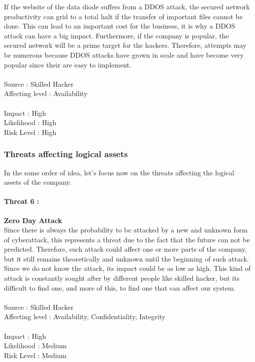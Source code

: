 \documentclass[a4paper,10pt]{article}
\begin{document}
If the website of the data diode suffers from a DDOS attack, the secured network productivity can grid to a total halt if the transfer of important files cannot be done. This can lead to an important cost for the business, it is why a DDOS attack can have a big impact. Furthermore, if the company is popular, the secured network will be a prime target for the hackers. Therefore, attempts may be numerous because DDOS attacks have grown in scale and have become very popular since their are easy to implement.\\ \\
Source : Skilled Hacker \\ 
Affecting level : Availability  \\ \\
Impact : High \\
Likelihood : High \\
Risk Level : High


\subsubsection{Threats affecting logical assets}
In the same order of idea, let's focus now on the threats affecting the logical assets of the company. 

\paragraph{Threat 6 :}  \textbf{Zero Day Attack} \\
\indent Since there is always the probability to be attacked by a new and unknown form of cyberattack, this represents a threat due to the fact that the future can not be predicted. Therefore, such attack could affect one or more parts of the company, but it still remains theoretically and unknown until the beginning of such attack.
Since we do not know the attack, its impact could be as low as high. This kind of attack is constantly sought after by different people like skilled hacker, but its difficult to find one, and more of this, to find one that can affect our system. \\ \\
Source : Skilled Hacker \\ 
Affecting level : Availability, Confidentiality, Integrity  \\ \\
Impact : High \\
Likelihood : Medium \\
Risk Level : Medium
\end{document}
